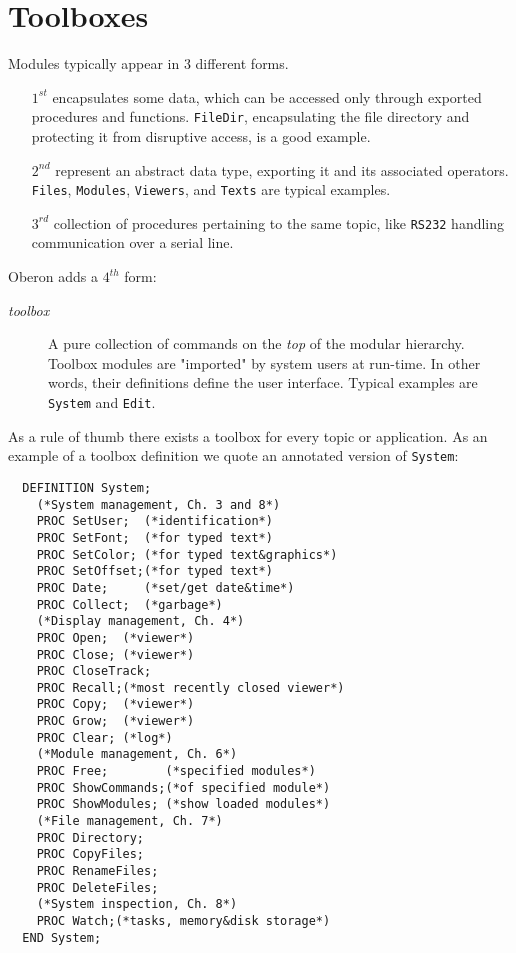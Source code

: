 \section{Toolboxes}
\label{sec:toolbox}
Modules typically appear in 3 different forms.
\begin{itemize}
  \item[$1^{st}$] encapsulates some data, which can be accessed only through exported
    procedures and functions. \verb|FileDir|, encapsulating the file directory and
    protecting it from disruptive access, is a good example.
  \item[$2^{nd}$] represent an abstract data type, exporting it and its associated operators.
    \verb|Files|, \verb|Modules|, \verb|Viewers|, and \verb|Texts| are typical examples.
  \item[$3^{rd}$] collection of procedures pertaining to the same topic,
    like \verb|RS232| handling communication over a serial line.
\end{itemize}
Oberon adds a $4^{th}$ form:
\begin{description}
  \item[\emph{toolbox}] A pure collection of commands on the \emph{top} of the modular hierarchy.
    Toolbox modules are "imported" by system users at run-time. In other words, their definitions
    define the user interface. Typical examples are \verb|System| and \verb|Edit|.
\end{description}
As a rule of thumb there exists a toolbox for every topic or application.
As an example of a toolbox definition we quote an annotated version of \verb|System|:
\begin{verbatim}
  DEFINITION System;
    (*System management, Ch. 3 and 8*)
    PROC SetUser;  (*identification*)
    PROC SetFont;  (*for typed text*)
    PROC SetColor; (*for typed text&graphics*)
    PROC SetOffset;(*for typed text*)
    PROC Date;     (*set/get date&time*)
    PROC Collect;  (*garbage*)
    (*Display management, Ch. 4*)
    PROC Open;  (*viewer*)
    PROC Close; (*viewer*)
    PROC CloseTrack;
    PROC Recall;(*most recently closed viewer*)
    PROC Copy;  (*viewer*)
    PROC Grow;  (*viewer*)
    PROC Clear; (*log*)
    (*Module management, Ch. 6*)
    PROC Free;        (*specified modules*)
    PROC ShowCommands;(*of specified module*)
    PROC ShowModules; (*show loaded modules*)
    (*File management, Ch. 7*)
    PROC Directory;
    PROC CopyFiles;
    PROC RenameFiles;
    PROC DeleteFiles;
    (*System inspection, Ch. 8*)
    PROC Watch;(*tasks, memory&disk storage*)
  END System;
\end{verbatim}
